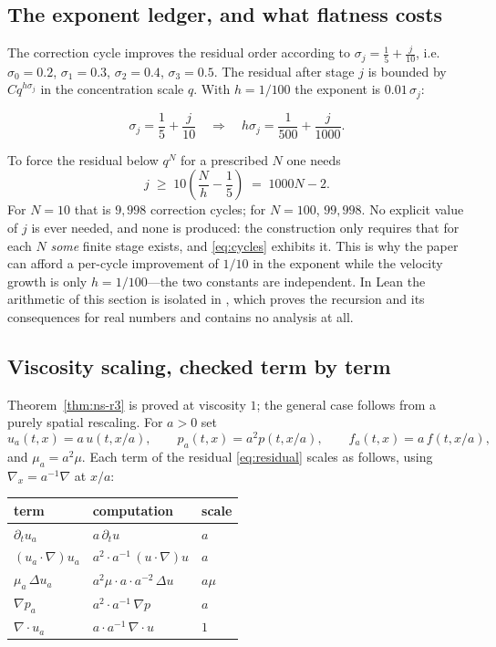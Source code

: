 \subsection{The exponent ledger, and what flatness costs}
\label{ex:ledger}

The correction cycle improves the residual order according to $\sigma_j=\tfrac15+\tfrac{j}{10}$,
i.e.\ $\sigma_0=0.2$, $\sigma_1=0.3$, $\sigma_2=0.4$, $\sigma_3=0.5$. The residual after
stage $j$ is bounded by $C q^{h\sigma_j}$ in the concentration scale $q$. With $h=1/100$
the exponent is $0.01\,\sigma_j$:

\[
\sigma_j = \frac15+\frac{j}{10}
\quad\Longrightarrow\quad
h\sigma_j = \frac{1}{500}+\frac{j}{1000}.
\]

To force the residual below $q^{N}$ for a prescribed $N$ one needs
\begin{equation}
j \;\ge\; 10\left(\frac{N}{h}-\frac15\right) \;=\; 1000N-2 .
\label{eq:cycles}
\end{equation}
For $N=10$ that is $9{,}998$ correction cycles; for $N=100$, $99{,}998$. No explicit value
of $j$ is ever needed, and none is produced: the construction only requires that for each
$N$ \emph{some} finite stage exists, and \eqref{eq:cycles} exhibits it. This is why the
paper can afford a per-cycle improvement of $1/10$ in the exponent while the velocity
growth is only $h=1/100$---the two constants are independent. In Lean the arithmetic of
this section is isolated in , which proves the
recursion and its consequences for real numbers and contains no analysis at all.

\subsection{Viscosity scaling, checked term by term}
\label{ex:viscosity}

Theorem~\ref{thm:ns-r3} is proved at viscosity $1$; the general case follows from a purely
spatial rescaling. For $a>0$ set
\[
u_a(t,x) = a\,u(t,x/a), \qquad p_a(t,x) = a^2 p(t,x/a), \qquad f_a(t,x) = a\,f(t,x/a),
\]
and $\mu_a = a^2\mu$. Each term of the residual \eqref{eq:residual} scales as follows,
using $\nabla_x = a^{-1}\nabla$ at $x/a$:

\begin{center}\small
\begin{tabular}{@{}lll@{}}
\toprule
term & computation & scale \\
\midrule
$\partial_t u_a$ & $a\,\partial_t u$ & $a$ \\
$(u_a\cdot\nabla)u_a$ & $a^2\cdot a^{-1}\,(u\cdot\nabla)u$ & $a$ \\
$\mu_a\,\Delta u_a$ & $a^2\mu\cdot a\cdot a^{-2}\,\Delta u$ & $a\mu$ \\
$\nabla p_a$ & $a^2\cdot a^{-1}\,\nabla p$ & $a$ \\
\midrule
$\nabla\cdot u_a$ & $a\cdot a^{-1}\,\nabla\cdot u$ & $1$ \\
\bottomrule
\end{tabular}
\end{center}

